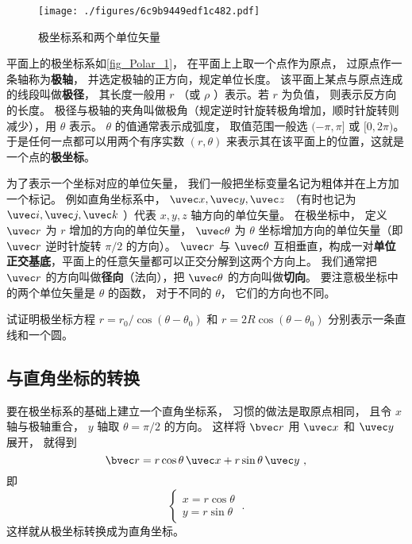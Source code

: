 
\begin{figure}[ht]
\centering
\texttt{[image: ./figures/6c9b9449edf1c482.pdf]}
\caption{极坐标系和两个单位矢量}\label{fig_Polar_1}
\end{figure}

平面上的极坐标系如\autoref{fig_Polar_1}， 在平面上上取一个点作为原点， 过原点作一条轴称为\textbf{极轴}， 并选定极轴的正方向，规定单位长度。 该平面上某点与原点连成的线段叫做\textbf{极径}， 其长度一般用 $r$ （或 $\rho$ ）表示。若 $r$ 为负值， 则表示反方向的长度。 极径与极轴的夹角叫做极角（规定逆时针旋转极角增加，顺时针旋转则减少），用 $\theta $ 表示。 $\theta$ 的值通常表示成弧度， 取值范围一般选 $(-\pi, \pi]$ 或 $[0, 2\pi)$。 于是任何一点都可以用两个有序实数 $(r,\theta)$ 来表示其在该平面上的位置，这就是一个点的\textbf{极坐标}。

为了表示一个坐标对应的单位矢量， 我们一般把坐标变量名记为粗体并在上方加一个标记。 例如直角坐标系中， $\uvec x, \uvec y, \uvec z$ （有时也记为 $\uvec i, \uvec j, \uvec k$ ）代表 $x,y,z$ 轴方向的单位矢量。 在极坐标中， 定义 $\uvec r$ 为 $r$ 增加的方向的单位矢量， $\uvec \theta$ 为 $\theta$ 坐标增加方向的单位矢量（即 $\uvec r$ 逆时针旋转 $\pi/2$ 的方向）。 $\uvec r$ 与 $\uvec \theta$ 互相垂直，构成一对\textbf{单位正交基底}，平面上的任意矢量都可以正交分解到这两个方向上。 我们通常把 $\uvec r$ 的方向叫做\textbf{径向}（法向），把 $\uvec \theta $ 的方向叫做\textbf{切向}。 要注意极坐标中的两个单位矢量是 $\theta$ 的函数， 对于不同的 $\theta$， 它们的方向也不同。

\begin{exercise}{}
试证明极坐标方程 $r = r_0/\cos(\theta - \theta_0)$ 和 $r = 2R\cos(\theta - \theta_0)$ 分别表示一条直线和一个圆。
\end{exercise}

\subsection{与直角坐标的转换}\label{sub_Polar_1}
要在极坐标系的基础上建立一个直角坐标系， 习惯的做法是取原点相同， 且令 $x$ 轴与极轴重合， $y$ 轴取 $\theta = \pi/2$ 的方向。 这样将 $\bvec r$ 用 $\uvec x$ 和 $\uvec y$ 展开， 就得到
\begin{equation}
\bvec r = r\cos\theta\,\uvec x + r\sin\theta\,\uvec y~,
\end{equation}
即
\begin{equation}\label{eq_Polar_2}
\begin{cases}
x = r\cos\theta\\
y = r\sin\theta
\end{cases}~.
\end{equation}
这样就从极坐标转换成为直角坐标。

